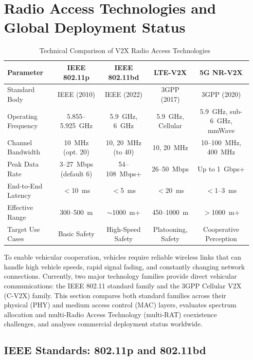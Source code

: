 \section{Radio Access Technologies and Global Deployment Status}
\label{sec:technologies_and_deployment}

\begin{table}[!t]
\centering
\caption{Technical Comparison of V2X Radio Access Technologies~\cite{nurkahfi2024sdn,anwar2019physical}}
\label{tab:rat_comparison}
\small
\begin{tabular}{lcccc}
\toprule
\textbf{Parameter} & \textbf{IEEE 802.11p} & \textbf{IEEE 802.11bd} & \textbf{LTE-V2X} & \textbf{5G NR-V2X} \\
\midrule
Standard Body & IEEE (2010) & IEEE (2022) & 3GPP (2017) & 3GPP (2020) \\
Operating Frequency & 5.855--5.925~GHz & 5.9~GHz, 6~GHz & 5.9~GHz, Cellular & 5.9~GHz, sub-6~GHz, mmWave \\
Channel Bandwidth & 10~MHz (opt. 20) & 10, 20~MHz (to 40) & 10, 20~MHz & 10--100~MHz, 400~MHz \\
Peak Data Rate & 3--27~Mbps (default 6) & 54--108~Mbps+ & 26--50~Mbps & Up to 1~Gbps+ \\
End-to-End Latency & $<$10~ms & $<$5~ms & $<$20~ms & $<$1--3~ms \\
Effective Range & 300--500~m & $\sim$1000~m+ & 450--1000~m & $>$1000~m+ \\
Target Use Cases & Basic Safety & High-Speed Safety & Platooning, Safety & Cooperative Perception \\
\bottomrule
\end{tabular}
\end{table}

To enable vehicular cooperation, vehicles require reliable wireless links that can handle high vehicle speeds, rapid signal fading, and constantly changing network connections.
Currently, two major technology families provide direct vehicular communications: the IEEE 802.11 standard family and the 3GPP Cellular V2X (C-V2X) family.
This section compares both standard families across their physical (PHY) and medium access control (MAC) layers, evaluates spectrum allocation and multi-Radio Access Technology (multi-RAT) coexistence challenges, and analyses commercial deployment status worldwide.

\subsection{IEEE Standards: 802.11p and 802.11bd}
\label{subsec:ieee_standards}

